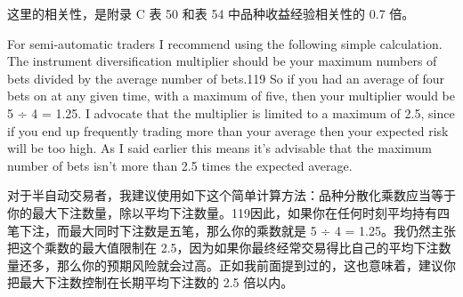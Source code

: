\begin{chineseblock}这里的相关性，是附录 C 表 50 和表 54 中品种收益经验相关性的 0.7 倍。\end{chineseblock}


\begin{englishblock} For semi-automatic traders I recommend using the following simple calculation. The instrument diversification multiplier should be your maximum numbers of bets divided by the average number of bets.119 So if you had an average of four bets on at any given time, with a maximum of five, then your multiplier would be 5 ÷ 4 = 1.25. I advocate that the multiplier is limited to a maximum of 2.5, since if you end up frequently trading more than your average then your expected risk will be too high. As I said earlier this means it's advisable that the maximum number of bets isn't more than 2.5 times the expected average. \end{englishblock}

\begin{chineseblock}对于半自动交易者，我建议使用如下这个简单计算方法：品种分散化乘数应当等于你的最大下注数量，除以平均下注数量。119因此，如果你在任何时刻平均持有四笔下注，而最大同时下注数是五笔，那么你的乘数就是 5 ÷ 4 = 1.25。我仍然主张把这个乘数的最大值限制在 2.5，因为如果你最终经常交易得比自己的平均下注数量还多，那么你的预期风险就会过高。正如我前面提到过的，这也意味着，建议你把最大下注数控制在长期平均下注数的 2.5 倍以内。\end{chineseblock}



